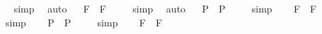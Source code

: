 \begin{isabellebody}
\isadelimproof
\ %
\endisadelimproof
%
\isatagproof
{}\isamarkupfalse%
\ simp\ \isamarkupfalse%
\ auto%
\endisatagproof
{\isafoldproof}%
%
\isadelimproof
%
\endisadelimproof
\isanewline
\ \isamarkupfalse%
\ {\isachardoublequoteopen}{\isacharbrackleft}\isactrlbold {\isasymbox}{\isasymphi}\isactrlsup F\ \isactrlbold {\isasymrightarrow}\ \isactrlbold {\isasymdiamond}{\isasymphi}\isactrlsup F{\isacharbrackright}\ {\isacharequal}\ {\isasymtop}{\isachardoublequoteclose}%
\isadelimproof
\ %
\endisadelimproof
%
\isatagproof
{}\isamarkupfalse%
\ simp\ \isamarkupfalse%
\ auto%
\endisatagproof
{\isafoldproof}%
%
\isadelimproof
%
\endisadelimproof
\isanewline
\ \isamarkupfalse%
\ {\isachardoublequoteopen}{\isacharbrackleft}\isactrlbold {\isasymbox}{\isasymphi}\isactrlsup P\ \isactrlbold {\isasymrightarrow}\ \isactrlbold {\isasymbox}\isactrlbold {\isasymbox}{\isasymphi}\isactrlsup P{\isacharbrackright}\ {\isacharequal}\ {\isasymtop}{\isachardoublequoteclose}%
\isadelimproof
\ %
\endisadelimproof
%
\isatagproof
{}\isamarkupfalse%
\ simp\ \isamarkupfalse%
%
\endisatagproof
{\isafoldproof}%
%
\isadelimproof
%
\endisadelimproof
\isanewline
\ \isamarkupfalse%
\ {\isachardoublequoteopen}{\isacharbrackleft}\isactrlbold {\isasymbox}{\isasymphi}\isactrlsup F\ \isactrlbold {\isasymrightarrow}\ \isactrlbold {\isasymbox}\isactrlbold {\isasymbox}{\isasymphi}\isactrlsup F{\isacharbrackright}\ {\isacharequal}\ {\isasymtop}{\isachardoublequoteclose}%
\isadelimproof
\ %
\endisadelimproof
%
\isatagproof
{}\isamarkupfalse%
\ simp\ \isamarkupfalse%
%
\endisatagproof
{\isafoldproof}%
%
\isadelimproof
%
\endisadelimproof
\isanewline
\ \isamarkupfalse%
\ {\isachardoublequoteopen}{\isacharbrackleft}\isactrlbold {\isasymdiamond}{\isasymphi}\isactrlsup P\ \isactrlbold {\isasymrightarrow}\ \isactrlbold {\isasymbox}\isactrlbold {\isasymdiamond}{\isasymphi}\isactrlsup P{\isacharbrackright}\ {\isacharequal}\ {\isasymtop}{\isachardoublequoteclose}%
\isadelimproof
\ %
\endisadelimproof
%
\isatagproof
{}\isamarkupfalse%
\ simp\ \isamarkupfalse%
%
\endisatagproof
{\isafoldproof}%
%
\isadelimproof
%
\endisadelimproof
\isanewline
\ \isamarkupfalse%
\ {\isachardoublequoteopen}{\isacharbrackleft}\isactrlbold {\isasymdiamond}{\isasymphi}\isactrlsup F\ \isactrlbold {\isasymrightarrow}\ \isactrlbold {\isasymbox}\isactrlbold {\isasymdiamond}{\isasymphi}\isactrlsup F{\isacharbrackright}\ {\isacharequal}\ {\isasymtop}{\isachardoublequoteclose}%

\end{isabellebody}
